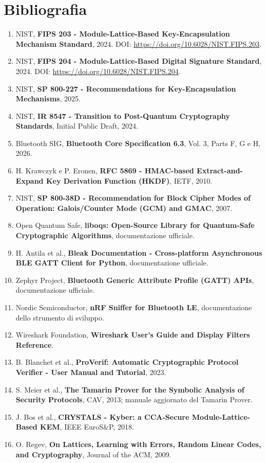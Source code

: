 \documentclass[11pt,a4paper]{article}
\begin{document}
\section*{Bibliografia}

\begin{enumerate}
\item NIST, \textbf{FIPS 203 - Module-Lattice-Based Key-Encapsulation
Mechanism Standard}, 2024. DOI: \url{https://doi.org/10.6028/NIST.FIPS.203}.
\item NIST, \textbf{FIPS 204 - Module-Lattice-Based Digital Signature
Standard}, 2024. DOI: \url{https://doi.org/10.6028/NIST.FIPS.204}.
\item NIST, \textbf{SP 800-227 - Recommendations for Key-Encapsulation
Mechanisms}, 2025.
\item NIST, \textbf{IR 8547 - Transition to Post-Quantum Cryptography
Standards}, Initial Public Draft, 2024.
\item Bluetooth SIG, \textbf{Bluetooth Core Specification 6.3}, Vol. 3,
Parts F, G e H, 2026.
\item H. Krawczyk e P. Eronen, \textbf{RFC 5869 - HMAC-based
Extract-and-Expand Key Derivation Function (HKDF)}, IETF, 2010.
\item NIST, \textbf{SP 800-38D - Recommendation for Block Cipher Modes of
Operation: Galois/Counter Mode (GCM) and GMAC}, 2007.
\item Open Quantum Safe, \textbf{liboqs: Open-Source Library for
Quantum-Safe Cryptographic Algorithms}, documentazione ufficiale.
\item H. Antila et al., \textbf{Bleak Documentation - Cross-platform
Asynchronous BLE GATT Client for Python}, documentazione ufficiale.
\item Zephyr Project, \textbf{Bluetooth Generic Attribute Profile (GATT)
APIs}, documentazione ufficiale.
\item Nordic Semiconductor, \textbf{nRF Sniffer for Bluetooth LE},
documentazione dello strumento di sviluppo.
\item Wireshark Foundation, \textbf{Wireshark User's Guide and Display
Filters Reference}.
\item B. Blanchet et al., \textbf{ProVerif: Automatic Cryptographic
Protocol Verifier - User Manual and Tutorial}, 2023.
\item S. Meier et al., \textbf{The Tamarin Prover for the Symbolic
Analysis of Security Protocols}, CAV, 2013; manuale aggiornato del Tamarin
Prover.
\item J. Bos et al., \textbf{CRYSTALS - Kyber: a CCA-Secure
Module-Lattice-Based KEM}, IEEE EuroS\&P, 2018.
\item O. Regev, \textbf{On Lattices, Learning with Errors, Random Linear
Codes, and Cryptography}, Journal of the ACM, 2009.
\end{enumerate}
\end{document}
